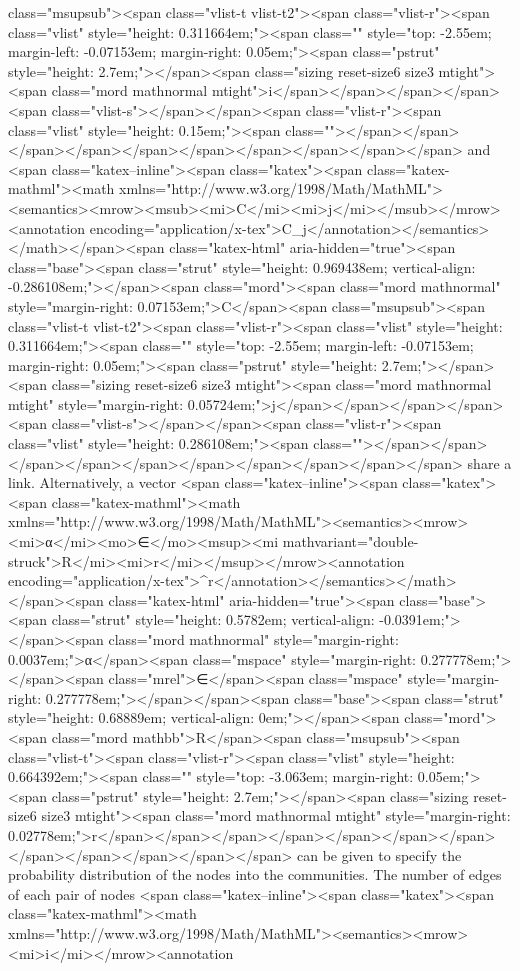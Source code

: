class="msupsub"><span class="vlist-t vlist-t2"><span class="vlist-r"><span class="vlist" style="height: 0.311664em;"><span class="" style="top: -2.55em; margin-left: -0.07153em; margin-right: 0.05em;"><span class="pstrut" style="height: 2.7em;"></span><span class="sizing reset-size6 size3 mtight"><span class="mord mathnormal mtight">i</span></span></span></span><span class="vlist-s">​</span></span><span class="vlist-r"><span class="vlist" style="height: 0.15em;"><span class=""></span></span></span></span></span></span></span></span></span></span> and <span class="katex--inline"><span class="katex"><span class="katex-mathml"><math xmlns="http://www.w3.org/1998/Math/MathML"><semantics><mrow><msub><mi>C</mi><mi>j</mi></msub></mrow><annotation encoding="application/x-tex">C_j</annotation></semantics></math></span><span class="katex-html" aria-hidden="true"><span class="base"><span class="strut" style="height: 0.969438em; vertical-align: -0.286108em;"></span><span class="mord"><span class="mord mathnormal" style="margin-right: 0.07153em;">C</span><span class="msupsub"><span class="vlist-t vlist-t2"><span class="vlist-r"><span class="vlist" style="height: 0.311664em;"><span class="" style="top: -2.55em; margin-left: -0.07153em; margin-right: 0.05em;"><span class="pstrut" style="height: 2.7em;"></span><span class="sizing reset-size6 size3 mtight"><span class="mord mathnormal mtight" style="margin-right: 0.05724em;">j</span></span></span></span><span class="vlist-s">​</span></span><span class="vlist-r"><span class="vlist" style="height: 0.286108em;"><span class=""></span></span></span></span></span></span></span></span></span></span> share a link. Alternatively, a vector <span class="katex--inline"><span class="katex"><span class="katex-mathml"><math xmlns="http://www.w3.org/1998/Math/MathML"><semantics><mrow><mi>α</mi><mo>∈</mo><msup><mi mathvariant="double-struck">R</mi><mi>r</mi></msup></mrow><annotation encoding="application/x-tex">\alpha \in {}^r</annotation></semantics></math></span><span class="katex-html" aria-hidden="true"><span class="base"><span class="strut" style="height: 0.5782em; vertical-align: -0.0391em;"></span><span class="mord mathnormal" style="margin-right: 0.0037em;">α</span><span class="mspace" style="margin-right: 0.277778em;"></span><span class="mrel">∈</span><span class="mspace" style="margin-right: 0.277778em;"></span></span><span class="base"><span class="strut" style="height: 0.68889em; vertical-align: 0em;"></span><span class="mord"><span class="mord mathbb">R</span><span class="msupsub"><span class="vlist-t"><span class="vlist-r"><span class="vlist" style="height: 0.664392em;"><span class="" style="top: -3.063em; margin-right: 0.05em;"><span class="pstrut" style="height: 2.7em;"></span><span class="sizing reset-size6 size3 mtight"><span class="mord mathnormal mtight" style="margin-right: 0.02778em;">r</span></span></span></span></span></span></span></span></span></span></span></span> can be given to specify the probability distribution of the nodes into the communities. The number of edges of each pair of nodes <span class="katex--inline"><span class="katex"><span class="katex-mathml"><math xmlns="http://www.w3.org/1998/Math/MathML"><semantics><mrow><mi>i</mi></mrow><annotation 